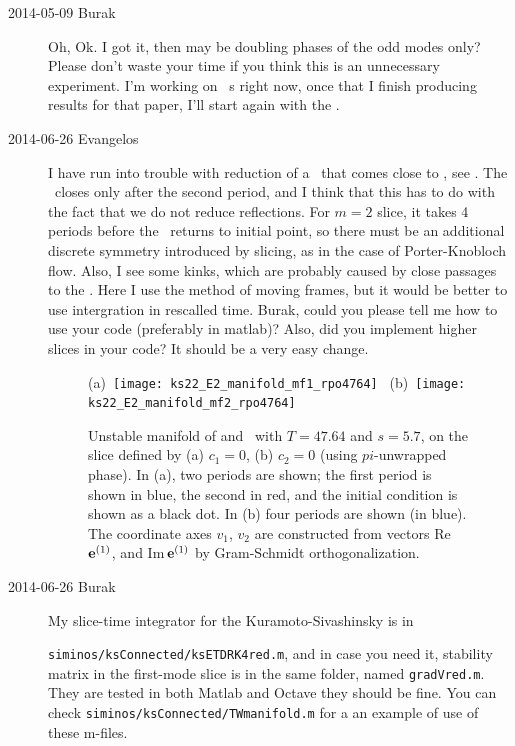 \begin{description}
\item[2014-05-09 Burak] Oh, Ok. I got it, then may be doubling phases of
the odd modes only? Please don't waste your time if you think this is an
unnecessary experiment. I'm working on \twoMode\ \rpo s right now, once
that I finish producing results for that paper, I'll start again with the
\KS .

\item[2014-06-26 Evangelos] I have run into trouble with reduction of a
\rpo\ that comes close to , see
. The \rpo\ closes only after the
second period, and I think that this has to do with the fact that we do
not reduce reflections. For $m=2$ slice, it takes 4 periods before the
\rpo\ returns to initial point, so there must be an additional discrete
symmetry introduced by slicing, as in the case of Porter-Knobloch flow.
Also, I see some kinks, which are probably caused by close passages to
the {\sliceBord}. Here I use the method of moving frames, but it would be
better to use intergration in rescalled time. Burak, could you please
tell me how to use your code (preferably in matlab)? Also, did you
implement higher slices in your code? It should be a very easy change.

\begin{figure}
\begin{center}
(a)~\texttt{[image: ks22\_E2\_manifold\_mf1\_rpo4764]}~
(b)~\texttt{[image: ks22\_E2\_manifold\_mf2\_rpo4764]}~
\end{center}
\caption{
Unstable manifold of  and \rpo\ with $T=47.64$ and $s=5.7$,
on the slice defined by (a) $c_1=0$, (b) $c_2=0$ (using $pi$-unwrapped phase).
In (a), two periods are shown;
the first period is shown in blue, the second in red, and the initial condition is shown as a black dot.
In (b) four periods are shown (in blue).
The coordinate axes $v_1$, $v_2$ are constructed from vectors Re\,$\jEigvec[1]$,
and Im\,$\jEigvec[1]$ by Gram-Schmidt
orthogonalization.
       }
\label{f:ks22_E2_manifold_mf1_rpo4764}
\end{figure}

\item[2014-06-26 Burak] My slice-time integrator for the Kuramoto-Sivashinsky is in

\texttt{siminos/ksConnected/ksETDRK4red.m}, and in case you need it, stability matrix
in the first-mode slice is in the same folder, named \texttt{gradVred.m}. They are
tested in both Matlab and Octave they should be fine. You can check
\texttt{siminos/ksConnected/TWmanifold.m} for a an example of use of these m-files.


\end{description}
